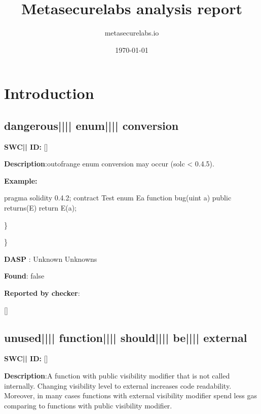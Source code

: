 \documentclass{article}
\title{Metasecurelabs analysis report}
\author{metasecurelabs.io }
\date{\today}
\begin{document}
 

\maketitle 

\section{Introduction} 
\subsection{dangerous{||\textunderscore|| }enum{||\textunderscore|| }conversion} 
\textbf{SWC{|\textunderscore| }ID:} []

\textbf{Description}:out{\textendash}of{\textendash}range enum conversion may occur (solc < 0.4.5).


\textbf{Example:} 
\begin{ffcode} 

pragma solidity 0.4.2;
contract Test{
  enum E{a}
  function bug(uint a) public returns(E){
        return E(a);
    }
}

\end{ffcode} 
\} 

\} 

\textbf{DASP} : Unknown Unknowns

\textbf{Found}: false

\textbf{Reported by checker}: 
\begin{ffcode} 

[]
\end{ffcode} 
\subsection{unused{||\textunderscore|| }function{||\textunderscore|| }should{||\textunderscore|| }be{||\textunderscore|| }external} 
\textbf{SWC{|\textunderscore| }ID:} []

\textbf{Description}:A function with public visibility modifier that is not called internally. Changing visibility level to external increases code readability. Moreover, in many cases functions with external visibility modifier spend less gas comparing to functions with public visibility modifier.
\end{document}
